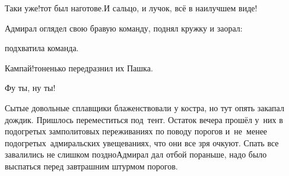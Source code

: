 \diagdash Таки уже!\mdash тот был наготове.\mdash И сальцо, и лучок, всё в наилучшем виде!

Адмирал оглядел свою бравую команду, поднял кружку и заорал:


\mdash подхватила команда.

\diagdash Кампай!\mdash тоненько передразнил их Пашка.

\diagdash Фу ты, ну ты!


Сытые довольные сплавщики блаженствовали у костра, но тут опять закапал дождик. Пришлось переместиться под~тент.
Остаток вечера прошёл у~них в подогретых замполитовых переживаниях по поводу порогов и~не~менее подогретых~адмиральских увещеваниях, что они все зря очкуют.
Спать все завалились не слишком поздно\mdash Адмирал дал отбой пораньше, надо было выспаться перед завтрашним штурмом порогов.

\begin{center}
\end{center}
